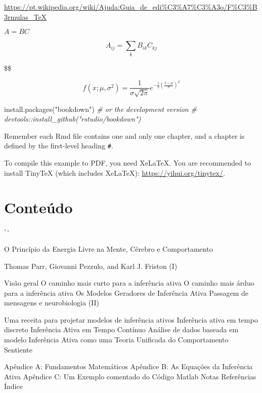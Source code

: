 \documentclass[
]{book}
\newenvironment{Shaded}{\begin{snugshade}}{\end{snugshade}}
\newcommand{\CommentTok}[1]{\textcolor[rgb]{0.56,0.35,0.01}{\textit{#1}}}
\newcommand{\FunctionTok}[1]{\textcolor[rgb]{0.00,0.00,0.00}{#1}}
\newcommand{\NormalTok}[1]{#1}
\newcommand{\StringTok}[1]{\textcolor[rgb]{0.31,0.60,0.02}{#1}}
\begin{document}
\url{https://pt.wikipedia.org/wiki/Ajuda:Guia_de_edi\%C3\%A7\%C3\%A3o/F\%C3\%B3rmulas_TeX}

\(A = BC\)

\[ A_{ij} =  \sum_{k}B_{ik}C_{kj} \]

\$\$
\Leftarrow \Rightarrow \Leftrightarrow
\Longleftarrow \Longrightarrow \Longleftrightarrow
\Uparrow \Downarrow \Updownarrow

\[
f(x;\mu,\sigma^2) = \frac{1}{\sigma\sqrt{2\pi}}
e^{ -\frac{1}{2}\left(\frac{x-\mu}{\sigma}\right)^2 }
\]

\begin{Shaded}
\begin{Highlighting}[]
\FunctionTok{install.packages}\NormalTok{(}\StringTok{"bookdown"}\NormalTok{)}
\CommentTok{\# or the development version}
\CommentTok{\# devtools::install\_github("rstudio/bookdown")}
\end{Highlighting}
\end{Shaded}

Remember each Rmd file contains one and only one chapter, and a chapter is defined by the first-level heading \texttt{\#}.

To compile this example to PDF, you need XeLaTeX. You are recommended to install TinyTeX (which includes XeLaTeX): \url{https://yihui.org/tinytex/}.

\hypertarget{conteuxfado}{%
\chapter*{Conteúdo}\label{conteuxfado}}

'\,`

O Princípio da Energia Livre na Mente, Cérebro e Comportamento

Thomas Parr, Giovanni Pezzulo, and Karl J. Friston
(I)

Visão geral
O caminho mais curto para a inferência ativa
O caminho mais árduo para a inferência ativa
Os Modelos Geradores de Inferência Ativa
Passagem de mensagens e neurobiologia
(II)

Uma receita para projetar modelos de inferência ativos
Inferência ativa em tempo discreto
Inferência Ativa em Tempo Contínuo
Análise de dados baseada em modelo
Inferência Ativa como uma Teoria Unificada do Comportamento Sentiente

Apêndice A: Fundamentos Matemáticos
Apêndice B: As Equações da Inferência Ativa
Apêndice C: Um Exemplo comentado do Código Matlab
Notas
Referências
Índice
\end{document}
